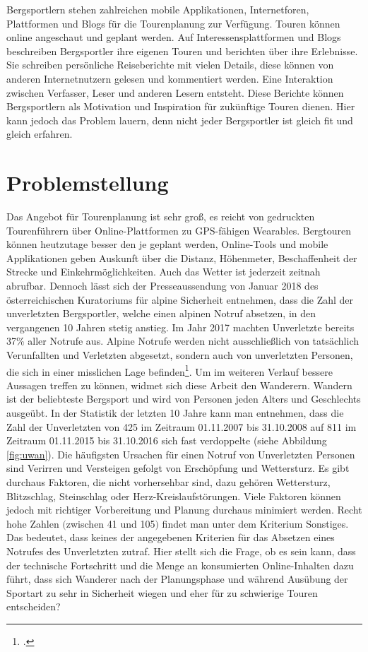 Bergsportlern stehen zahlreichen mobile Applikationen, Internetforen, Plattformen und Blogs für die Tourenplanung zur Verfügung. Touren können online angeschaut und geplant werden. Auf Interessensplattformen und Blogs beschreiben Bergsportler ihre eigenen Touren und berichten über ihre  Erlebnisse. Sie schreiben persönliche Reiseberichte mit vielen Details, diese können von anderen Internetnutzern gelesen und kommentiert werden. Eine Interaktion zwischen Verfasser, Leser und anderen Lesern entsteht. Diese Berichte können Bergsportlern als Motivation und Inspiration für zukünftige Touren dienen. Hier kann jedoch das Problem lauern, denn nicht jeder Bergsportler ist gleich fit und gleich erfahren.


\section{Problemstellung}

Das Angebot für Tourenplanung ist sehr groß, es reicht von gedruckten Tourenführern über Online-Plattformen zu GPS-fähigen Wearables. Bergtouren können heutzutage besser den je geplant werden, Online-Tools und mobile Applikationen geben Auskunft über die Distanz, Höhenmeter, Beschaffenheit der Strecke und Einkehrmöglichkeiten. Auch das Wetter ist jederzeit zeitnah abrufbar. Dennoch lässt sich der Presseaussendung von Januar 2018 des österreichischen Kuratoriums für alpine Sicherheit entnehmen, dass die Zahl der unverletzten Bergsportler, welche einen alpinen Notruf absetzen, in den vergangenen 10 Jahren stetig anstieg. Im Jahr 2017 machten Unverletzte bereits 37\% aller Notrufe aus. Alpine Notrufe werden nicht ausschließlich von tatsächlich Verunfallten und Verletzten abgesetzt, sondern auch von unverletzten Personen, die sich in einer misslichen Lage befinden\footcite{kurasi}.
Um im weiteren Verlauf bessere Aussagen treffen zu können, widmet sich diese Arbeit den Wanderern. Wandern ist der beliebteste Bergsport und wird von Personen jeden Alters und Geschlechts ausgeübt.
In der Statistik der letzten 10 Jahre kann man entnehmen, dass die Zahl der Unverletzten von 425 im Zeitraum 01.11.2007 bis 31.10.2008 auf 811 im Zeitraum 01.11.2015 bis 31.10.2016 sich fast verdoppelte (siehe Abbildung \ref{fig:uwan}). Die häufigsten Ursachen für einen Notruf von Unverletzten Personen sind {\glqq Verirren und Versteigen\grqq} gefolgt von {\glqq Erschöpfung\grqq}  und {\glqq Wettersturz\grqq}. Es gibt durchaus Faktoren, die nicht vorhersehbar sind, dazu gehören Wettersturz, Blitzschlag, Steinschlag oder Herz-Kreislaufstörungen. Viele Faktoren können jedoch mit richtiger Vorbereitung und Planung durchaus minimiert werden. Recht hohe Zahlen $($zwischen 41 und 105$)$ findet man unter dem Kriterium {\glqq Sonstiges\grqq}. Das bedeutet, dass keines der angegebenen Kriterien für das Absetzen eines Notrufes des Unverletzten zutraf. Hier stellt sich die Frage, ob es sein kann, dass der technische Fortschritt und die Menge an konsumierten Online-Inhalten dazu führt, dass sich Wanderer nach der Planungsphase und während Ausübung der Sportart zu sehr in Sicherheit wiegen und eher für zu schwierige Touren entscheiden?


